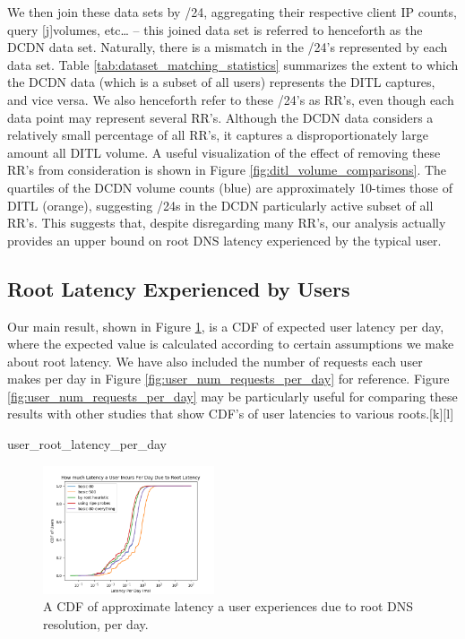 \documentclass[sigconf,nonacm,10pt]{acmart}
\begin{document}
We then join these data sets by /24, aggregating their respective client
IP counts, query {[}j{]}volumes, etc\ldots{} -- this joined data set is
referred to henceforth as the DCDN data set. Naturally, there is a
mismatch in the /24's represented by each data set. Table
\ref{tab:dataset_matching_statistics} summarizes the extent to which the
DCDN data (which is a subset of all users) represents the DITL captures,
and vice versa. We also henceforth refer to these /24's as RR's, even
though each data point may represent several RR's. Although the DCDN
data considers a relatively small percentage of all RR's, it captures a
disproportionately large amount all DITL volume. A useful visualization
of the effect of removing these RR's from consideration is shown in
Figure \ref{fig:ditl_volume_comparisons}. The quartiles of the DCDN
volume counts (blue) are approximately 10-times those of DITL (orange),
suggesting /24s in the DCDN particularly active subset of all RR's. This
suggests that, despite disregarding many RR's, our analysis actually
provides an upper bound on root DNS latency experienced by the typical
user.

\subsection{Root Latency Experienced by
Users}\label{root-latency-experienced-by-users-1}

Our main result, shown in Figure \ref{fig:user_root_latency_per_day}, is
a CDF of expected user latency per day, where the expected value is
calculated according to certain assumptions we make about root latency.
We have also included the number of requests each user makes per day in
Figure \ref{fig:user_num_requests_per_day} for reference. Figure
\ref{fig:user_num_requests_per_day} may be particularly useful for
comparing these results with other studies that show CDF's of user
latencies to various roots.{[}k{]}{[}l{]}

user\_root\_latency\_per\_day

\begin{figure}
    \centering
    \includegraphics[width=0.45\textwidth]{figures/user_root_latency_per_day.png}
    \caption{A CDF of approximate latency a user experiences due to root DNS resolution, per day.}
    \label{fig:user_root_latency_per_day}
\end{figure}
\end{document}
